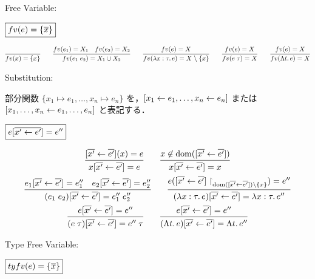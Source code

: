 Free Variable:

$\fbox{$\mathop{fv}(e) = \{\overline{x}\}$}$

\begin{gather*}
  \infer{\freevar(x) = \{x\}}{}
  \hspace{2em}
  \infer{\freevar(e_1\; e_2) = X_1 \cup X_2}{
    \freevar(e_1) = X_1
    &
    \freevar(e_2) = X_2
  }
  \hspace{2em}
  \infer{\freevar(\lambda x: \tau\ldotp e) = X \rcomplement \{x\}}{
    \freevar(e) = X
  }
  \hspace{2em}
  \infer{\freevar(e\; \tau) = X}{
    \freevar(e) = X
  }
  \hspace{2em}
  \infer{\freevar(\Lambda t\ldotp e) = X}{
    \freevar(e) = X
  }
\end{gather*}

Substitution:

部分関数 $\{x_1 \mapsto e_1, \ldots, x_n \mapsto e_n\}$ を，$[x_1 \gets e_1, \ldots, x_n \gets e_n]$ または $[x_1, \ldots, x_n \gets e_1, \ldots, e_n]$ と表記する．

$\fbox{$e[\overline{x' \gets e'}] = e''$}$

\begin{gather*}
  \infer{x[\overline{x'} \assign \overline{e'}] = e}{
    [\overline{x'} \assign \overline{e'}](x) = e
  }
  \hspace{2em}
  \infer{x[\overline{x'} \assign \overline{e'}]= x}{
    x \not\in \dom([\overline{x'} \assign \overline{e'}])
  }
  \\
  \infer{(e_1\; e_2)[\overline{x'} \assign \overline{e'}] = e''_1\; e''_2}{
    e_1[\overline{x'} \assign \overline{e'}] = e''_1
    &
    e_2[\overline{x'} \assign \overline{e'}] = e''_2
  }
  \hspace{2em}
  \infer{(\lambda x: \tau\ldotp e)[\overline{x'} \assign \overline{e'}] = \lambda x: \tau\ldotp e''}{
    e([\overline{x'} \assign \overline{e'}]\restrict_{\dom([\overline{x'} \assign \overline{e'}]) \rcomplement \{x\}}) = e''
  }
  \\
  \infer{(e\; \tau)[\overline{x'} \assign \overline{e'}] = e''\; \tau}{
    e[\overline{x'} \assign \overline{e'}] = e''
  }
  \hspace{2em}
  \infer{(\Lambda t\ldotp e)[\overline{x'} \assign \overline{e'}] = \Lambda t\ldotp e''}{
    e[\overline{x'} \assign \overline{e'}] = e''
  }
\end{gather*}

Type Free Variable:

$\fbox{$\mathop{tyfv}(e) = \{\overline{x}\}$}$

